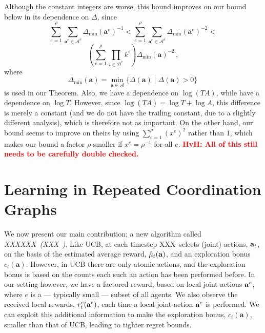 \documentclass{article}
\newcommand{\est}{\hat{\mu}}
\newcommand{\algname}{XXXXXX\ }
\newcommand{\algab}{XXX\ }
\newcommand{\hvh}[1]{\textcolor{red}{\bf HvH: #1}}
\begin{document}
Although the constant integers are worse, this bound improves on our bound below in its dependence on $\Delta$, since
\[
\sum_{e=1}^\rho \sum_{\mathbf{a}^e \in \mathcal{A}^e} \Delta_{\min}(\mathbf{a}^e)^{-1} < \sum_{e=1}^\rho \sum_{\mathbf{a}^e \in \mathcal{A}^e} \Delta_{\min}(\mathbf{a}^e)^{-2} < 
\]\[
 \left( \sum_{e=1}^\rho \prod_{i \in \mathcal{D}^e} k^i \right) \Delta_{\min}(\mathbf{a})^{-2}\,,
\]
where
\[
\Delta_{\min}(\mathbf{a}) = \min_{\mathbf{a} \in \mathcal{A}} \{ \Delta(\mathbf{a}) \mid \Delta(\mathbf{a}) > 0 \} \,
\]
is used in our Theorem. Also, we have a dependence on $\log(T A)$, while \citeauthor{chen2013combinatorial} have a dependence on $\log T$. However, since $\log( T A ) = \log T + \log A$, this difference is merely a constant (and we do not have the trailing constant, due to a slightly different analysis), which is therefore not as important. On the other hand, our bound seems to improve on theirs by using $\sum_{e=1}^\rho (x^e)^2$ rather than $1$, which makes our bound a factor $\rho$ smaller if $x^e = \rho^{-1}$ for all $e$. \hvh{All of this still needs to be carefully double checked.}

\section{Learning in Repeated Coordination Graphs}
We now present our main contribution; a new algorithm called \emph{\algname (\algab\!)}. Like UCB, at each timestep \algab selects (joint) actions, ${\bf a}_t$, on the basis of the estimated average reward,  $\est_{t}({\bf a})$, and an exploration bonus $c_t(\mathbf{a})$. However, in UCB there are only atomic actions, and the exploration bonus is based on the counts each such an action has been performed before. In our setting however, we have a factored reward, based on local joint actions ${\bf a}^e$, where $e$ is a --- typically small --- subset of all agents. We also observe the received local rewards, $r^e_t({\bf a}^e)$, each time a local joint action ${\bf a}^e$ is performed. We can exploit this additional information to make the exploration bonus, $c_t(\mathbf{a})$, smaller than that of UCB, leading to tighter regret bounds. 
\end{document}
